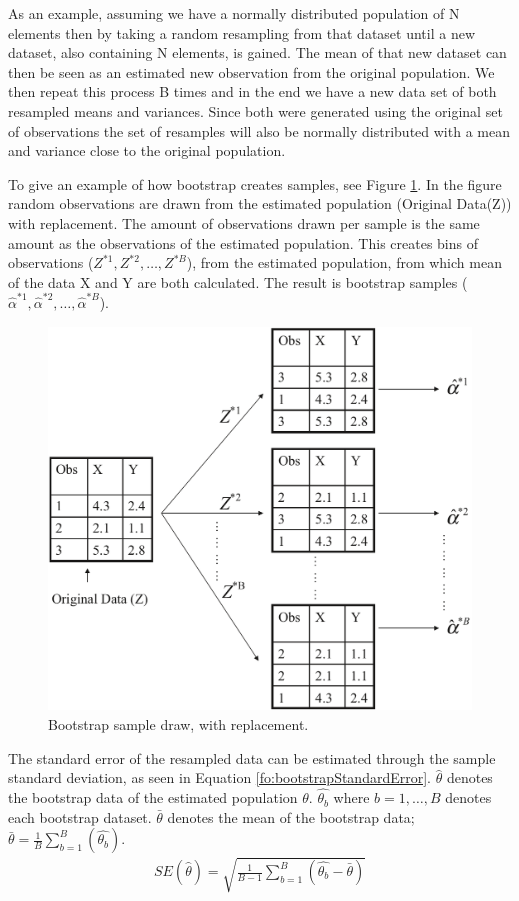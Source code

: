 As an example, assuming we have a normally distributed population of N elements then by taking a random resampling from that dataset until a new dataset, also containing N elements, is gained. The mean of that new dataset can then be seen as an estimated new observation from the original population. We then repeat this process B times and in the end we have a new data set of both resampled means and variances. Since both were generated using the original set of observations the set of resamples will also be normally distributed with a mean and variance close to the original population.
\fi

To give an example of how bootstrap creates samples, see Figure \ref{fig:bootstrapDrawWithReplacement}. In the figure random observations are drawn from the estimated population (Original Data(Z)) with replacement. The amount of observations drawn per sample is the same amount as the observations of the estimated population. This creates bins of observations ($Z^{*1}, Z^{*2},\ldots,Z^{*B}$), from the estimated population, from which mean of the data X and Y are both calculated. The result is bootstrap samples ($\hat\alpha^{*1}, \hat\alpha^{*2}, \ldots, \hat\alpha^{*B}$).

\begin{figure}[H]
	\centering
	\includegraphics[width=0.5\linewidth]{crossValidation/bootstrapDrawWithReplacement}
	\caption{Bootstrap sample draw, with replacement.}
	\label{fig:bootstrapDrawWithReplacement}
\end{figure}

The standard error of the resampled data can be estimated through the sample standard deviation, as seen in Equation \ref{fo:bootstrapStandardError}. $\hat{\theta}$ denotes the bootstrap data of the estimated population $\theta$. $\hat{\theta_{b}}$ where $b=1,\dots,B$ denotes each bootstrap dataset. $\bar{\theta}$ denotes the mean of the bootstrap data; $\bar{\theta} = \frac{1}{B} \sum_{b=1}^{B}(\hat{\theta_{b}})$.
\begin{align}\label{fo:bootstrapStandardError}
	SE(\hat{\theta}) = \sqrt{\frac{1}{B-1} \sum_{b=1}^{B}(\hat{\theta_{b}} - \bar{\theta})} 
\end{align}

